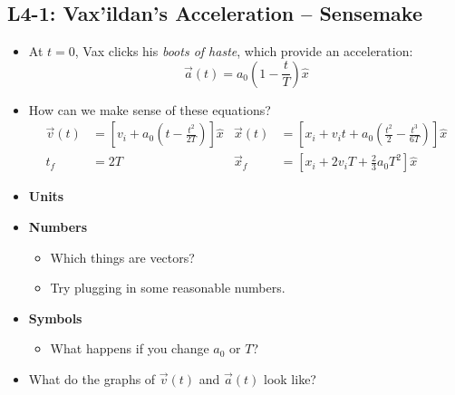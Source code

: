 \documentclass[]{article}
\begin{document}
\begin{PresentSpace}
\vspace{-10pt}
\section*{L4-1: Vax'ildan's Acceleration -- Sensemake}
\vspace{-10pt}
\begin{itemize}
	\item At $t=0$, Vax clicks his \textit{boots of haste}, which provide an acceleration:
	\[
	\vec{a}(t) = a_{0}\left(1-\frac{t}{T}\right)\hat{x}
	\]
	\item How can we make sense of these equations?
	\begin{align*}
	\vec{v}(t) & = \left[v_{i}+a_{0}\left(t-\frac{t^{2}}{2T}\right)\right]\hat{x} & \vec{x}(t) & = \left[x_{i}+v_{i}t+a_{0}\left(\frac{t^{2}}{2}-\frac{t^{3}}{6T}\right)\right]\hat{x} \\
	t_{f} & = 2T & \vec{x}_{f} & = \left[x_{i}+2v_{i}T+\frac{2}{3}a_{0}T^{2}\right]\hat{x}
	\end{align*}
\end{itemize}
\begin{multicols}{2}
	\begin{itemize}
		\item \textbf{Units}
		\item \textbf{Numbers}
		\begin{itemize}
			\item Which things are vectors?
			\item Try plugging in some reasonable numbers.
		\end{itemize}
		\item \textbf{Symbols}
		\begin{itemize}
			\item What happens if you change $a_{0}$ or $T$?
		\end{itemize}
		\item What do the graphs of $\vec{v}(t)$ and $\vec{a}(t)$ look like?
	\end{itemize}
\end{multicols}
\end{PresentSpace}

\end{document}
